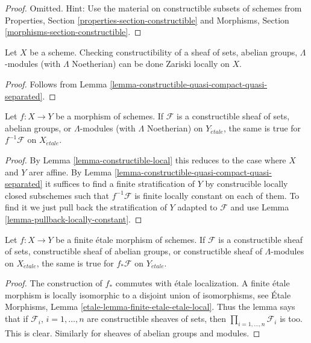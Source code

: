 \begin{proof}
Omitted. Hint: Use the material on constructible subsets of schemes
from Properties, Section \ref{properties-section-constructible} and
Morphisms, Section \ref{morphisms-section-constructible}.
\end{proof}

\begin{lemma}
\label{lemma-constructible-local}
Let $X$ be a scheme. Checking constructibility of a sheaf
of sets, abelian groups, $\Lambda$-modules (with $\Lambda$ Noetherian)
can be done Zariski locally on $X$.
\end{lemma}

\begin{proof}
Follows from Lemma \ref{lemma-constructible-quasi-compact-quasi-separated}.
\end{proof}

\begin{lemma}
\label{lemma-pullback-constructible}
Let $f : X \to Y$ be a morphism of schemes. If $\mathcal{F}$ is a
constructible sheaf of sets, abelian groups, or $\Lambda$-modules
(with $\Lambda$ Noetherian) on $Y_{\acute{e}tale}$, the same
is true for $f^{-1}\mathcal{F}$ on $X_{\acute{e}tale}$.
\end{lemma}

\begin{proof}
By Lemma \ref{lemma-constructible-local} this reduces to the case
where $X$ and $Y$ arer affine. By
Lemma \ref{lemma-constructible-quasi-compact-quasi-separated}
it suffices to find a finite stratification of $Y$ by construcible
locally closed subschemes such that $f^{-1}\mathcal{F}$ is finite locally
constant on each of them.
To find it we just pull back the stratification of $Y$ adapted to
$\mathcal{F}$ and use
Lemma \ref{lemma-pullback-locally-constant}.
\end{proof}

\begin{lemma}
\label{lemma-pushforward-constructible}
Let $f : X \to Y$ be a finite \'etale morphism of schemes.
If $\mathcal{F}$ is a constructible sheaf of sets,
constructible sheaf of abelian groups, or constructible
sheaf of $\Lambda$-modules on $X_{\acute{e}tale}$, the same is
true for $f_*\mathcal{F}$ on $Y_{\acute{e}tale}$.
\end{lemma}

\begin{proof}
The construction of $f_*$ commutes with \'etale localization.
A finite \'etale morphism is locally isomorphic to a disjoint union
of isomorphisms, see
\'Etale Morphisms, Lemma \ref{etale-lemma-finite-etale-etale-local}.
Thus the lemma says that if $\mathcal{F}_i$, $i = 1, \ldots, n$
are constructible sheaves of sets, then
$\prod_{i = 1, \ldots, n} \mathcal{F}_i$ is too.
This is clear. Similarly for sheaves of abelian groups and modules.
\end{proof}

